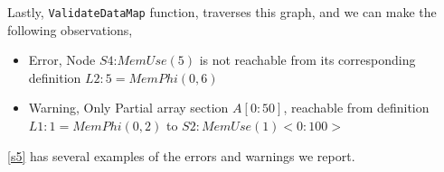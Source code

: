 Lastly, \texttt{ValidateDataMap} function, traverses this graph, 
and we can make the following observations,
\begin{itemize}
    \vspace{-5pt}
 \item Error, Node $S4$:$MemUse(5)$ is not reachable from its 
corresponding  
 definition  $L2:5 = MemPhi(0,6)$ 
 \item Warning, Only Partial array section $A[0:50]$, reachable from definition
 $L1: 1 = MemPhi(0,2)$ to $S2:MemUse(1)<0:100>$
\end{itemize}
\autoref{s5} has several examples of the errors and warnings we report.
% 
% 
